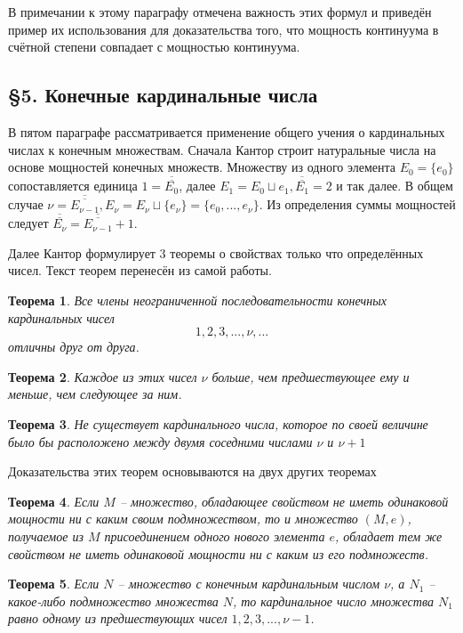 \documentclass[a4paper,12pt]{extarticle}
\newtheorem{theorem}{Теорема}[subsection]
\theoremstyle{definition}
\newcommand{\car}[1]{\overline{\overline{#1}}}
\begin{document}
В примечании к этому параграфу отмечена важность этих формул и приведён пример их использования для доказательства того,
что мощность континуума в счётной степени совпадает с мощностью континуума.

\subsection{\S 5. Конечные кардинальные числа}
В пятом параграфе рассматривается применение общего учения о кардинальных числах к конечным множествам.
Сначала Кантор строит натуральные числа на основе мощностей конечных множеств.
Множеству из одного элемента $E_0 = \{e_0\}$ сопоставляется единица $1 = \car{E_0}$, далее $E_1 = E_0 \sqcup {e_1}, \car{E_1} = 2$ и так далее.
В общем случае $\nu = \car{E_{\nu - 1}}, E_{\nu} = E_{\nu} \sqcup \{e_{\nu}\} = \{e_0, ..., e_{\nu}\}$.
Из определения суммы мощностей следует $\car{E_{\nu}} = \car{E_{\nu-1}} + 1$.

Далее Кантор формулирует 3 теоремы о свойствах только что определённых чисел.
Текст теорем перенесён из самой работы.
\begin{theorem}
\label{A}
Все члены неограниченной последовательности конечных кардинальных чисел $$1, 2, 3, ..., \nu,...$$ отличны друг от друга.
\end{theorem}
\begin{theorem}
\label{B}
Каждое из этих чисел $\nu$ больше, чем предшествующее ему и меньше, чем следующее за ним.
\end{theorem}
\begin{theorem}
\label{C}
Не существует кардинального числа, которое по своей величине было бы расположено между двумя соседними числами $\nu$ и $\nu + 1$
\end{theorem}
Доказательства этих теорем основываются на двух других теоремах
\begin{theorem}
\label{D}
Если $M$ -- множество, обладающее свойством не иметь одинаковой мощности ни с каким своим подмножеством, то и множество $(M, e)$,
получаемое из $M$ присоединением  одного нового элемента $e$, обладает тем же свойством не иметь одинаковой мощности ни с каким из его подмножеств.
\end{theorem}
\begin{theorem}
\label{E}
Если $N$ -- множество с конечным кардинальным числом $\nu$, а $N_1$ -- какое-либо подмножество множества $N$, то кардинальное число множества $N_1$ равно одному из предшествующих чисел $1, 2, 3, ..., \nu - 1$.
\end{theorem}
\end{document}
